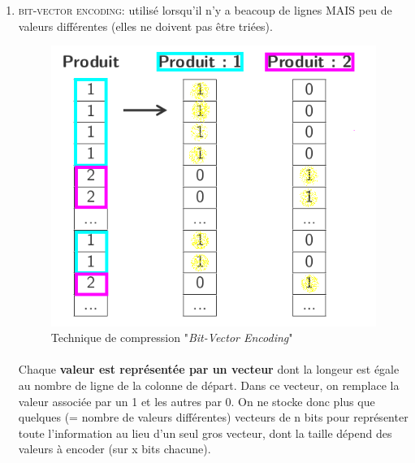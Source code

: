 {\begin{enumerate}
\paragraph{}
A l'étage le plus haut, il y aura donc autant de tuple qu'il y a de valeur différentes et à l'étage le plus bas, il y aura autant de valeur qu'il y a de lignes initialement.
\paragraph{}
En repartant de la colonne "Prix", on peut alors retrouver le "Produit" et le "Quadri" qui sont associés à une valeur grâce au tuples.

\item \textcolor{ltred}{\textsc{bit-vector encoding}}: utilisé lorsqu'il n'y a beacoup de lignes MAIS peu de valeurs différentes (elles ne doivent pas être triées).
	\begin{figure}[h!]
	\center \includegraphics[scale=.35]{images/colonnes-compression-bit}
	\caption{Technique de compression "\textit{Bit-Vector Encoding}" \cite{ref1}}\label{compression-bit}
	\end{figure}
\paragraph{}
Chaque \textbf{valeur est représentée par un vecteur} dont la longeur est égale au nombre de ligne de la colonne de départ. Dans ce vecteur, on remplace la valeur associée par un 1 et les autres par 0. On ne stocke donc plus que quelques (= nombre de valeurs différentes) vecteurs de n bits pour représenter toute l'information au lieu d'un seul gros vecteur, dont la taille dépend des valeurs à encoder (sur x bits chacune).


\end{enumerate}}
